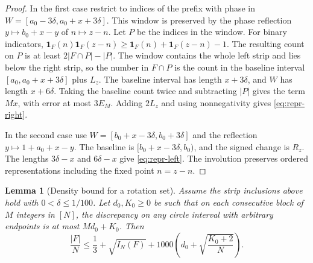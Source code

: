 \documentclass[11pt,reqno]{amsart}
\newtheorem{lemma}[theorem]{Lemma}
\newcommand{\ind}{\mathbf 1}
\numberwithin{equation}{section}
\begin{document}
\begin{proof}
In the first case restrict to indices of the prefix with phase in
\(W=[a_0-3\delta,a_0+x+3\delta]\). This window is preserved by the
phase reflection \(y\mapsto b_0+x-y\) of \(n\mapsto z-n\).
Let \(P\) be the indices in the window. For binary indicators,
\(\ind_F(n)\ind_F(z-n)\ge\ind_F(n)+\ind_F(z-n)-1\).
The resulting count on \(P\) is at least \(2|F\cap P|-|P|\).
The window contains the whole left strip and lies below the right
strip, so the number in \(F\cap P\) is the count in the baseline
interval \([a_0,a_0+x+3\delta]\) plus \(L_z\).
The baseline interval has length \(x+3\delta\), and \(W\)
has length \(x+6\delta\). Taking the baseline count twice and
subtracting \(|P|\) gives the term \(M x\), with error at most
\(3E_M\). Adding \(2L_z\) and using nonnegativity gives
\eqref{eq:repr-right}.

In the second case use \(W=[b_0+x-3\delta,b_0+3\delta]\)
and the reflection \(y\mapsto1+a_0+x-y\).
The baseline is \([b_0+x-3\delta,b_0)\), and the signed change
is \(R_z\). The lengths \(3\delta-x\) and \(6\delta-x\)
give \eqref{eq:repr-left}. The involution preserves ordered
representations including the fixed point \(n=z-n\).
\end{proof}

\begin{lemma}[Density bound for a rotation set]\label{lem:integer-density}
Assume the strip inclusions above hold with \(0<\delta\le1/100\).
Let \(d_0,K_0\ge0\) be such that on each consecutive block of \(M\)
integers in \([N]\), the discrepancy on any circle interval with
arbitrary endpoints is at most \(Md_0+K_0\). Then
\begin{equation}\label{eq:integer-density}
 \frac{|F|}{N}\le\frac13+\sqrt{I_N(F)}
             +1000\left(d_0+\sqrt{\frac{K_0+2}{N}}\right).
\end{equation}
\end{lemma}
\end{document}

